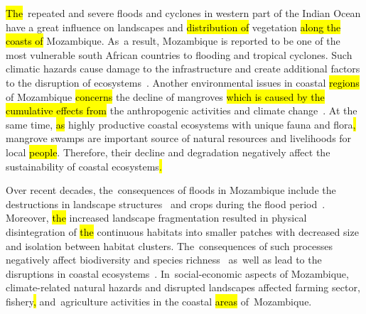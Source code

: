 \documentclass[coasts,article,accept,pdftex,oneauthor]{Definitions/mdpi}
\begin{document}
\hl{The}~repeated and severe floods and cyclones in\hl{ }western part of the Indian Ocean have a great influence on{ }landscapes and \hl{distribution of }vegetation \hl{along the coasts of} Mozambique. As~a result, Mozambique is reported to be one of the most vulnerable south African countries{\hl{ }to} flooding and tropical cyclones{. Such climatic hazards }cause\hl{ }damage to {the }infrastructure and {create additional factors to the disruption of }ecosystems~\cite{NHANGUMBE2023101015,SALVUCCI2020106713,Gall}. {Another\hl{ }}environmental {issues in} coastal \hl{regions} of Mozambique \hl{concerns }the decline of mangroves \hl{{which} is caused by the cumulative effects from }the anthropogenic activities and climate change~\cite{COME2023106813}. {At the same time, }\hl{as }highly productive coastal ecosystems with unique fauna and flora\hl{, }mangrove swamps are important source of natural resources and livelihoods for local \hl{people}. Therefore, their decline and degradation negatively affect the sustainability of coastal ecosystems\hl{.}

{Over\hl{ }recent decades, the~}consequences of floods in Mozambique include the destructions in landscape structures~\cite{FICHTNER2023103329}\hl{ }{and} crops during the flood\hl{ }{period}~\cite{BOFANA2022112808}. {Moreover, \hl{the }increased }landscape fragmentation {resulted in physical disintegration of \hl{the }continuous habitats into smaller patches with decreased}\hl{ }size and isolation {between\hl{ }habitat clusters. The~consequences of such processes negatively affect }biodiversity and species richness~\cite{Guldemond}\hl{ }as~well as lead to the disruptions in coastal ecosystems~\cite{RAMAYANTI20221025}. In~social-economic aspects of Mozambique, climate-related natural hazards and disrupted landscapes affected farming sector, fishery\hl{, }and~agriculture activities in the coastal \hl{areas} of~Mozambique. 
\end{document}
